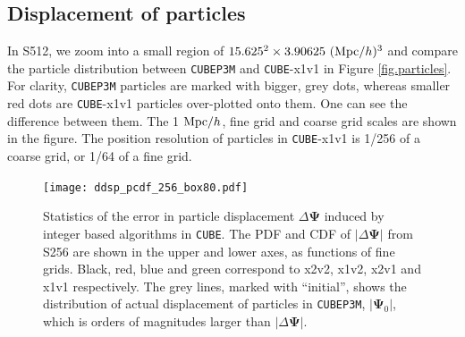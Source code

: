 \documentclass[10pt,twocolumn,preprint]{emulateapj}
\newcommand{\bs}{\boldsymbol}
\begin{document}
\subsection{Displacement of particles}
In S512, we zoom into a small region of $15.625^2\times 3.90625\ ({\rm Mpc}/h)^3$ and compare the particle distribution between {\tt CUBEP3M} and {\tt CUBE}-x1v1 in Figure \ref{fig.particles}. For clarity, {\tt CUBEP3M} particles are marked with bigger, grey dots, whereas smaller red dots are {\tt CUBE}-x1v1 particles over-plotted onto them. One can see the difference between them. The 1 ${\rm Mpc}/h$, fine grid and coarse grid scales are shown in the figure. The position resolution of particles in {\tt CUBE}-x1v1 is 1/256 of a coarse grid, or 1/64 of a fine grid.

\begin{figure}[]
\centering
  \texttt{[image: ddsp\_pcdf\_256\_box80.pdf]}
 \caption{Statistics of the error in particle displacement $\Delta{\bs\Psi}$ induced by integer based algorithms in {\tt CUBE}. The PDF and CDF of $|\Delta{\bs\Psi}|$ from S256 are shown in the upper and lower axes, as functions of fine grids. Black, red, blue and green correspond to x2v2, x1v2, x2v1 and x1v1 respectively. The grey lines, marked with ``initial'', shows the distribution of actual displacement of particles in {\tt CUBEP3M}, $|{\bs\Psi}_0|$, which is orders of magnitudes larger than $|\Delta{\bs\Psi}|$. }
\label{fig.dsp}
\end{figure}
\end{document}
